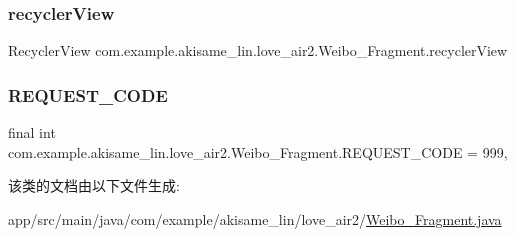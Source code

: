 \subsubsection{\texorpdfstring{recyclerView}{recyclerView}}
{\footnotesize\ttfamily Recycler\+View com.\+example.\+akisame\+\_\+lin.\+love\+\_\+air2.\+Weibo\+\_\+\+Fragment.\+recycler\+View\hspace{0.3cm}{\ttfamily [private]}}

\mbox{\label{classcom_1_1example_1_1akisame__lin_1_1love__air2_1_1_weibo___fragment_a00bbf05ff80669b0150b1629574a87de}} 
\subsubsection{\texorpdfstring{REQUEST\_CODE}{REQUEST\_CODE}}
{\footnotesize\ttfamily final int com.\+example.\+akisame\+\_\+lin.\+love\+\_\+air2.\+Weibo\+\_\+\+Fragment.\+R\+E\+Q\+U\+E\+S\+T\+\_\+\+C\+O\+DE = 999\hspace{0.3cm}{\ttfamily [static]}, {\ttfamily [private]}}



该类的文档由以下文件生成\+:\begin{DoxyCompactItemize}
\item 
app/src/main/java/com/example/akisame\+\_\+lin/love\+\_\+air2/\mbox{\hyperlink{_weibo___fragment_8java}{Weibo\+\_\+\+Fragment.\+java}}\end{DoxyCompactItemize}
